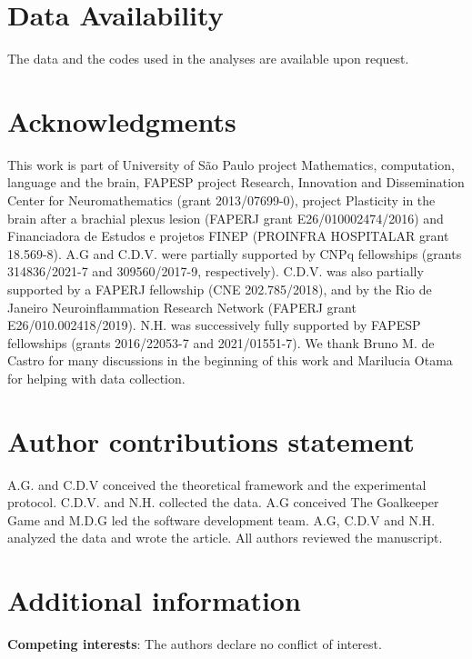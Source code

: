 \documentclass[fleqn,10pt]{wlscirep}
\begin{document}
\section*{Data Availability}

The data and the codes used in the analyses are available upon request. 



\section*{Acknowledgments} 

This work is part of University of S\~ao Paulo project Mathematics, computation, language and the brain, FAPESP project Research, Innovation and Dissemination Center for Neuromathematics (grant 2013/07699-0), project Plasticity in the brain after a brachial plexus lesion (FAPERJ grant E26/010002474/2016) and Financiadora de Estudos e projetos FINEP (PROINFRA HOSPITALAR grant 18.569-8). A.G and C.D.V. were partially supported by CNPq fellowships (grants 314836/2021-7 and 309560/2017-9, respectively). C.D.V. was also partially supported by a FAPERJ fellowship (CNE 202.785/2018), and by the Rio de Janeiro Neuroinflammation Research Network (FAPERJ grant E26/010.002418/2019). N.H. was successively fully supported by FAPESP fellowships (grants 2016/22053-7 and 2021/01551-7). We thank Bruno M. de Castro for many discussions in the beginning of this work and Marilucia Otama for helping with data collection.
	
\section*{Author contributions statement}

A.G. and C.D.V conceived the theoretical framework and the experimental protocol. C.D.V. and N.H. collected the data. A.G conceived The Goalkeeper Game and M.D.G led the software development team. A.G, C.D.V and N.H. analyzed the data and wrote the article. All authors reviewed the manuscript.

\section*{Additional information}

\textbf{Competing interests}: The authors declare no conflict of interest. 
		
\end{document}
